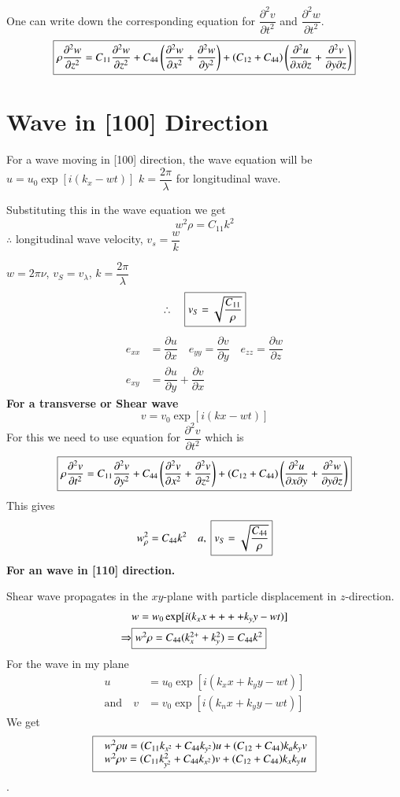 One can write down the corresponding equation for $\dfrac{\partial^{2}v}{\partial t^{2}}$ and $\dfrac{\partial^{2}w}{\partial t^{2}}$.
$$
\fbox{$\rho \dfrac{\partial^{2}w}{\partial z^{2}}=C_{11}\dfrac{\partial^{2}w}{\partial z^{2}}+C_{44}\left(\dfrac{\partial^{2}w}{\partial x^{2}}+\dfrac{\partial^{2}w}{\partial y^{2}}\right)+(C_{12}+C_{44})\left(\dfrac{\partial^{2}u}{\partial x\partial z}+\dfrac{\partial^{2}v}{\partial y\partial z}\right)$}
$$

\section*{Wave in [100] Direction}

For a wave moving in [100] direction, the wave equation will be $u=u_{0}\exp [i(k_{x}-wt)]$ $k=\dfrac{2\pi}{\lambda}$ for longitudinal wave.

Substituting this in the wave equation we get
$$
w^{2}\rho=C_{11}k^{2}
$$
$\therefore$ longitudinal wave velocity, $v_{s}=\dfrac{w}{k}$

$w=2\pi \nu$, $v_{S}=v_{\lambda}$, $k=\dfrac{2\pi}{\lambda}$
$$
\therefore\quad \fbox{$v_{S}=\sqrt{\dfrac{C_{11}}{\rho}}$}
$$
\begin{align*}
e_{xx} &= \dfrac{\partial u}{\partial x}\quad e_{yy}=\dfrac{\partial v}{\partial y}\quad e_{zz}=\dfrac{\partial w}{\partial z}\\
e_{xy} &= \dfrac{\partial u}{\partial y}+\dfrac{\partial v}{\partial x}\tag{*}
\end{align*}
{\bf For a transverse or Shear wave}
$$
v=v_{0}\exp [i(kx-wt)]
$$
For this we need to use equation for $\dfrac{\partial^{2}v}{\partial t^{2}}$ which is
$$
\fbox{$\rho\dfrac{\partial^{2}v}{\partial t^{2}}=C_{11}\dfrac{\partial^{2}v}{\partial y^{2}}+C_{44}\left(\dfrac{\partial^{2}v}{\partial x^{2}}+\dfrac{\partial^{2}v}{\partial z^{2}}\right)+(C_{12}+C_{44})\left(\dfrac{\partial^{2}u}{\partial x\partial y}+\dfrac{\partial^{2}w}{\partial y\partial z}\right)$}
$$
This gives 
$$
w^{2}_{\rho}=C_{44}k^{2}\quad a, \ \fbox{$v_{S}=\sqrt{\dfrac{C_{44}}{\rho}}$}
$$
{\bf For an wave in [110] direction.}

Shear wave propagates in the $xy$-plane with particle displacement in $z$-direction.
\begin{align*}
& w=w_{0}\exp[i(k_{x}x++++k_{y}y-wt)]\\
\Rightarrow & \fbox{$w^{2}\rho=C_{44}(k^{2+}_{x}+k^{2}_{y})=C_{44}k^{2}$}
\end{align*}
For the wave in my plane
\begin{align*}
u &= u_{0}\exp [i(k_{x}x+k_{y}y-wt)]\\
\text{and}\quad v &= v_{0}\exp [i(k_{n}x+k_{y}y-wt)]
\end{align*}
We get
$$
\fbox{
$
\begin{array}{l}
w^{2}\rho u = (C_{11}k_{x^{2}}+C_{44}k_{y^{2}})u+(C_{12}+C_{44})k_{a}k_{y}v\\
w^{2}\rho v = (C_{11}k^{2}_{y^{2}}+C_{44}k_{x^{2}})v+(C_{12}+C_{44})k_{x}k_{y}u
  \end{array}$}
$$
.

